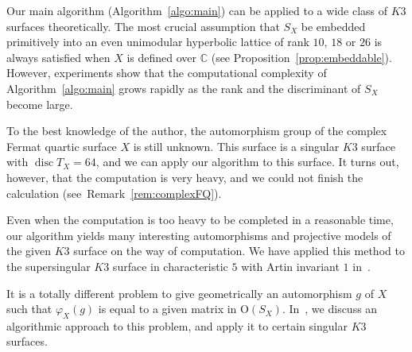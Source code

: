 \documentclass{amsart}
\theoremstyle{plain}
\theoremstyle{definition}
\theoremstyle{remark}
\numberwithin{equation}{section}
\numberwithin{table}{section}
\numberwithin{figure}{section}
\newcommand{\C}{\mathord{\mathbb C}}
\newcommand{\OG}{\mathord{\mathrm {O}}}
\newcommand{\disc}{\operatorname{\mathrm {disc}}\nolimits}
\begin{document}
%
%
\par
%
Our main algorithm (Algorithm~\ref{algo:main}) 
can be applied to a wide class of $K3$ surfaces theoretically.
The most crucial assumption that $S_X$ be embedded 
primitively into an even unimodular hyperbolic lattice of rank $10$, $18$ or $26$ 
is always satisfied when $X$ is defined over $\C$
(see Proposition~\ref{prop:embeddable}).
However,
experiments show that the computational complexity
of Algorithm~\ref{algo:main}
grows rapidly as the rank and the discriminant of $S_X$ become large.
%
\par
To the best knowledge of the author,
the automorphism group of the complex Fermat quartic surface $X$ is still unknown.
This surface is a singular $K3$ surface with $\disc T_X=64$,
and we can apply our algorithm to this surface.
It turns out, however,  that the computation is very heavy,
and we could not finish the calculation
(see~Remark~\ref{rem:complexFQ}).
\par
Even when the computation is too heavy to be completed in a reasonable time,
our algorithm yields many interesting automorphisms 
and projective models of the given $K3$ surface on the way of computation.
We have applied this method to the supersingular $K3$ surface in characteristic $5$ with Artin invariant $1$
in~\cite{MR3286672}.
%
\par
%
It is a totally different problem to give geometrically  an automorphism $g$ of $X$
such that $\varphi_X(g)$ is equal to a given matrix in $\OG(S_X)$.
In~\cite{ShimadaAutSingK3}, we discuss an algorithmic approach to this problem,
and apply it to  certain singular $K3$ surfaces.
%
%
%
\end{document}
